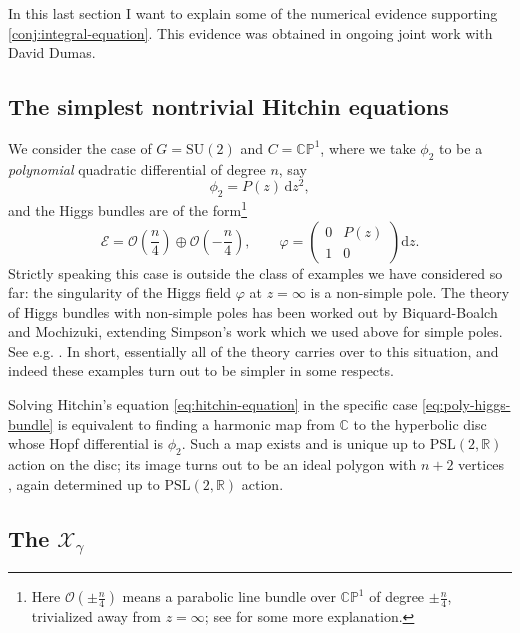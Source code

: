 \documentclass[12pt,letterpaper,reqno]{article}
\numberwithin{equation}{section}
\newcommand{\cO}{\ensuremath{\mathcal O}}
\newcommand{\cX}{\ensuremath{\mathcal X}}
\newcommand{\R}{\ensuremath{\mathbb R}}
\newcommand{\C}{\ensuremath{\mathbb C}}
\newcommand{\PP}{\ensuremath{\mathbb P}}
\newcommand{\cE}{{\mathcal E}}
\newcommand{\de}{\mathrm{d}}
\newcommand{\ti}[1]{\textit{#1}}
\newcommand{\PSL}{\mathrm{PSL}}
\newcommand{\SU}{\mathrm{SU}}
\newcommand{\insfig}[2]{

\medskip
\noindent
\begin{minipage}{\linewidth}

\makebox[\linewidth]{\texttt{[image: figures/\#1-crop.pdf]}}

\end{minipage}
\medskip

}
\begin{document}
In this last section I want to explain some of the numerical
evidence supporting \autoref{conj:integral-equation}.
This evidence was obtained in ongoing joint work with 
David Dumas.


\subsection{The simplest nontrivial Hitchin equations}

We consider the case of $G = \SU(2)$ 
and $C = \C\PP^1$, where we take $\phi_2$ to be a
\ti{polynomial} quadratic differential
of degree $n$, say
\begin{equation} \label{eq:poly-quad}
  \phi_2 = P(z) \, \de z^2,
\end{equation}
and the Higgs bundles are 
of the form\footnote{Here $\cO(\pm\frac{n}{4})$ means a parabolic line bundle 
over $\C\PP^1$ of
degree $\pm \frac{n}{4}$, trivialized away from $z = \infty$; see \cite{Fredrickson2017} for some more explanation.
}
\begin{equation} \label{eq:poly-higgs-bundle}
  \cE = \cO\left(\frac{n}{4}\right) \oplus \cO\left(-\frac{n}{4}\right), \qquad \varphi = \begin{pmatrix} 0 & P(z) \\ 1 & 0 \end{pmatrix} \de z.
\end{equation}
Strictly speaking this case is outside the class of
examples we have considered so far: the singularity
of the Higgs field $\varphi$ 
at $z = \infty$ is a non-simple pole.
The theory of Higgs bundles with non-simple poles
has been worked out by Biquard-Boalch and Mochizuki, extending
Simpson's work which we used above for simple
poles. See e.g. \cite{wnh}.
In short, essentially all
of the theory carries over to this situation, and indeed
these examples turn out to be simpler in some respects.

Solving Hitchin's equation \eqref{eq:hitchin-equation} 
in the specific
case \eqref{eq:poly-higgs-bundle} is equivalent to 
finding a harmonic map from $\C$ to the hyperbolic disc whose  Hopf differential is $\phi_2$. Such a map exists and 
is unique up to $\PSL(2,\R)$ action on the disc; its image
turns out to be an ideal polygon with $n+2$ vertices
\cite{HTTW}, again determined up to $\PSL(2,\R)$ action.

\insfig{higgs-metric-15}{0.8}


\subsection{The \texorpdfstring{$\cX_\gamma$}{Xgamma}}
\end{document}
